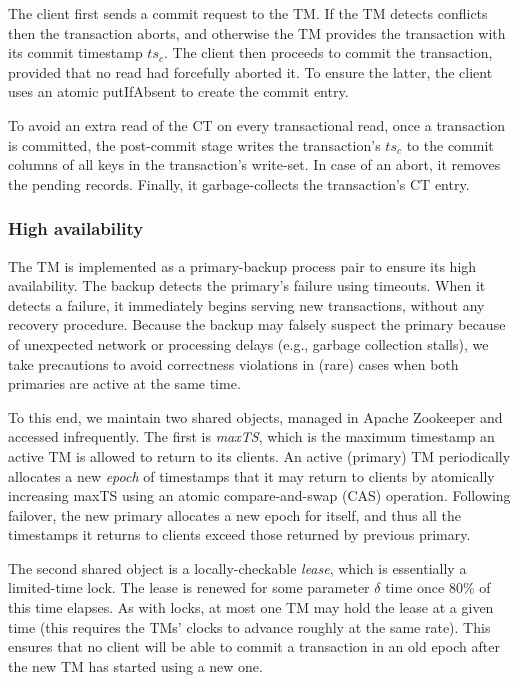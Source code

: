 The client first 
sends a commit request to the TM. 
If the TM detects conflicts then the transaction aborts, and otherwise the TM provides the transaction with its commit  timestamp $ts_c$. 
The client then proceeds to commit the transaction, provided that no read had forcefully aborted  it. To ensure the latter, the client uses 
an atomic putIfAbsent to create the commit entry. 

To avoid an extra read of the CT on every transactional read, once a transaction is committed, the post-commit stage writes 
the transaction's $ts_c$ to the commit columns of all keys in  the transaction's write-set. 
In case of an abort, it removes the pending records.
Finally, it garbage-collects the transaction's CT entry. 

\subsubsection{High availability} The TM is implemented as a primary-backup process pair to ensure its high availability. 
The backup detects the primary's failure using timeouts. When it detects a failure, it immediately begins serving new
transactions, without any recovery procedure. Because the backup may falsely suspect the primary because of
unexpected network or processing delays (e.g., garbage collection stalls), we take precautions to avoid correctness
violations in (rare) cases when both primaries are active at the same time.

To this end, we maintain two shared objects, managed in Apache Zookeeper and accessed infrequently.
The first is \emph{maxTS}, which is the maximum timestamp an active TM is allowed to return to its clients.
An active (primary) TM periodically allocates a new \emph{epoch} of timestamps that it may return to clients by atomically
increasing maxTS using an atomic compare-and-swap (CAS) operation.  
Following failover, the new primary  allocates a new epoch for itself, and thus all the timestamps it returns to clients
exceed those returned by previous primary. 

The second shared object is a locally-checkable \emph{lease}, which is essentially a  limited-time lock.
The lease is renewed for some parameter $\delta$  time once 80\% of this time elapses.
As with locks, at most one TM may hold the lease at a given time (this requires the TMs' clocks to advance roughly at the same rate). 
This ensures that no client will be able to commit a transaction in an old epoch after the new TM has started 
using a new one.



